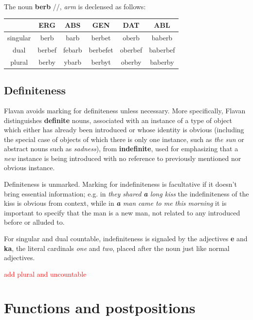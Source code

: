 \documentclass[10pt,oneside]{memoir}
\newcommand{\cmmnt}[1]{\textcolor{red}{#1}}
\newcommand{\ipa}[1]{/\textipa{#1}/}
\begin{document}
The noun \textbf{berb} \ipa{bErb}, \emph{arm} is declensed as follows:

\begin{center}
    \begin{tabular}[]{c|| c| c| c| c |c}
            & ERG & ABS & GEN & DAT & ABL \\
            \hline
    singular& berb & barb & berbet & oberb & baberb \\
    dual & berbef & febarb & berbefet & oberbef & baberbef\\
    plural & berby & ybarb & berbyt & oberby & baberby
    \end{tabular}
\end{center}

\subsection{Definiteness}

Flavan avoids marking for definiteness unless necessary. More specifically, Flavan distinguishes \textbf{definite} nouns, associated with an instance of a type of object which either has already been introduced or whose identity is obvious (including the special case of objects of which there is only one instance, such as \emph{the sun} or abstract nouns such as \emph{sadness}), from \textbf{indefinite}, used for emphasizing that a \emph{new} instance is being introduced with no reference to previously mentioned nor obvious instance.

Definiteness is unmarked. Marking for indefiniteness is facultative if it doesn't bring essential information; e.g. in \emph{they shared \textbf{a} long kiss} the indefiniteness of the kiss is obvious from context, while in \emph{\textbf{a} man came to me this morning} it is important to specify that the man is a new man, not related to any introduced before or alluded to.

For singular and dual countable, indefiniteness is signaled by the adjectives \textbf{e} and \textbf{ka}, the literal cardinals \emph{one} and \emph{two}, placed after the noun just like normal adjectives. 

\cmmnt{add plural and uncountable}



\pagebreak

\section{Functions and postpositions} \label{postpositions}
\end{document}
